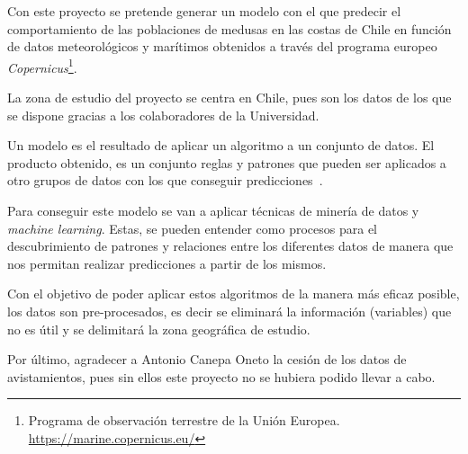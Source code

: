 Con este proyecto se pretende generar un modelo con el que predecir el comportamiento de las poblaciones de medusas en las costas de Chile en función de datos meteorológicos y marítimos obtenidos a través del programa europeo \emph{Copernicus}\footnote{Programa de observación terrestre de la Unión Europea. \url{https://marine.copernicus.eu/}}. 

La zona de estudio del proyecto se centra en Chile, pues son los datos de los que se dispone gracias a los colaboradores de la Universidad.

Un modelo es el resultado de aplicar un algoritmo a un conjunto de datos. El producto obtenido, es un conjunto reglas y patrones que pueden ser aplicados a otro grupos de datos con los que conseguir predicciones~\cite{modelo_definicion}.

Para conseguir este modelo se van a aplicar técnicas de minería de datos y \emph{machine learning}. Estas, se pueden entender como procesos para el descubrimiento de patrones y relaciones entre los diferentes datos de manera que nos permitan realizar predicciones a partir de los mismos.

Con el objetivo de poder aplicar estos algoritmos de la manera más eficaz posible, los datos son pre-procesados, es decir se eliminará la información (variables) que no es útil y se delimitará la zona geográfica de estudio. 

Por último, agradecer a Antonio Canepa Oneto la cesión de los datos de avistamientos, pues sin ellos este proyecto no se hubiera podido llevar a cabo.



